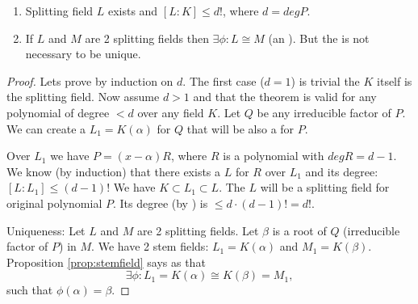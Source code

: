 \begin{theorem}
  \begin{enumerate}
    \item Splitting field $L$ exists and $\left[L:K\right] \le d!$,
      where $d = deg P$.
    \item If $L$ and $M$ are 2 splitting fields then
      $\exists \phi: L \cong M$ (an ). But
      the  is not necessary to be unique.
  \end{enumerate}
  \begin{proof}
    Lets prove by induction on $d$. The first case ($d = 1$) is
    trivial the $K$ itself is the splitting field. Now assume $d > 1$
    and that the theorem is valid for any polynomial of degree $< d$
    over any field $K$. Let $Q$ be any irreducible factor of $P$. We
    can create a  $L_1 = K\left(\alpha\right)$
    for $Q$ that will be also a  for $P$.

    Over $L_1$ we have $P = (x - \alpha) R$, where $R$ is a polynomial
    with $deg R = d - 1$. We know (by induction) that
    there exists a  $L$ for $R$ over $L_1$
    and its degree:
    \(
    \left[L:L_1\right] \le (d-1)!
    \)
    We have $K \subset L_1 \subset L$. The $L$ will be a splitting
    field for original polynomial $P$. Its degree (by
    ) is $ \le d \cdot (d-1)! = d!$.

    Uniqueness: Let $L$ and $M$ are 2 splitting fields. Let $\beta$ is
    a root of $Q$ (irreducible factor of $P$) in $M$.
    We have 2 stem fields: $L_1 = K\left(\alpha\right)$ and
    $M_1 = K\left(\beta\right)$. Proposition \ref{prop:stemfield} says
    as that
    \[
    \exists \phi: L_1 = K\left(\alpha\right) \cong
    K\left(\beta\right) = M_1, 
    \]
    such that $\phi(\alpha) = \beta$.


\end{proof}
\end{theorem}
